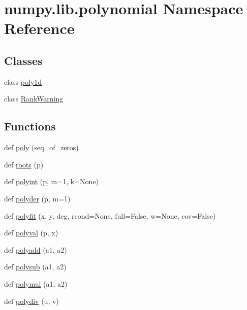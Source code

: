 \hypertarget{namespacenumpy_1_1lib_1_1polynomial}{}\section{numpy.\+lib.\+polynomial Namespace Reference}
\label{namespacenumpy_1_1lib_1_1polynomial}
\subsection*{Classes}
\begin{DoxyCompactItemize}
\item 
class \hyperlink{classnumpy_1_1lib_1_1polynomial_1_1poly1d}{poly1d}
\item 
class \hyperlink{classnumpy_1_1lib_1_1polynomial_1_1RankWarning}{Rank\+Warning}
\end{DoxyCompactItemize}
\subsection*{Functions}
\begin{DoxyCompactItemize}
\item 
def \hyperlink{namespacenumpy_1_1lib_1_1polynomial_a0b38f3b9ce59db65a5dd7475d8baf5f2}{poly} (seq\+\_\+of\+\_\+zeros)
\item 
def \hyperlink{namespacenumpy_1_1lib_1_1polynomial_a34f751d4a674960e5d7e1e275ec118a7}{roots} (p)
\item 
def \hyperlink{namespacenumpy_1_1lib_1_1polynomial_aab48ef7d0433f083a59e67879dd843be}{polyint} (p, m=1, k=None)
\item 
def \hyperlink{namespacenumpy_1_1lib_1_1polynomial_a65e87b3b7f328385344947a14ea36453}{polyder} (p, m=1)
\item 
def \hyperlink{namespacenumpy_1_1lib_1_1polynomial_a3b001aa881bfc281be7086b33c703933}{polyfit} (x, y, deg, rcond=None, full=False, w=None, cov=False)
\item 
def \hyperlink{namespacenumpy_1_1lib_1_1polynomial_ae0b1caf06f430f8f3603c978d0ced250}{polyval} (p, x)
\item 
def \hyperlink{namespacenumpy_1_1lib_1_1polynomial_a7b851d4c94b92ac3fb467fff3dba805a}{polyadd} (a1, a2)
\item 
def \hyperlink{namespacenumpy_1_1lib_1_1polynomial_a82ed7a695338e1fd554add2135a655ab}{polysub} (a1, a2)
\item 
def \hyperlink{namespacenumpy_1_1lib_1_1polynomial_a665c7ef52e6629867d2f89f2f3d74dde}{polymul} (a1, a2)
\item 
def \hyperlink{namespacenumpy_1_1lib_1_1polynomial_a1f6f7f494f1c679c43d2033c574c2f82}{polydiv} (u, v)
\end{DoxyCompactItemize}
